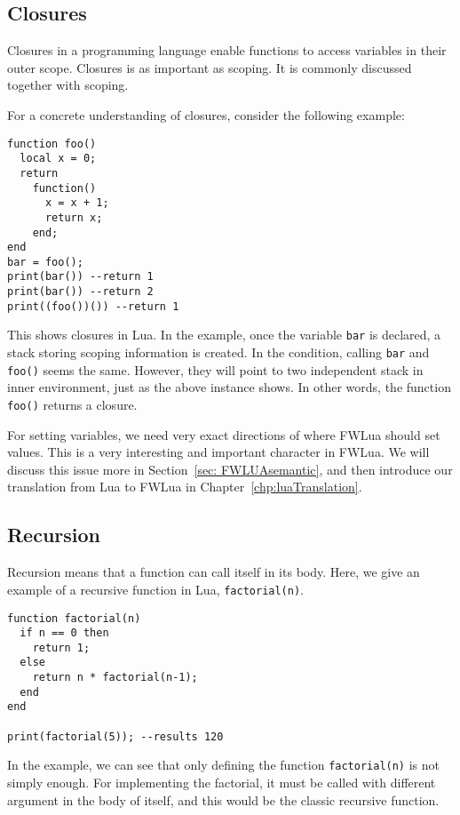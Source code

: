\subsection{Closures}
Closures in a programming language enable functions to access variables in their outer scope. Closures is as important as scoping. It is commonly discussed together with scoping.

For a concrete understanding of closures, consider the following example:
\begin{verbatim}
function foo()
  local x = 0;
  return 
    function() 
      x = x + 1;
      return x; 
    end;
end
bar = foo();
print(bar()) --return 1
print(bar()) --return 2
print((foo())()) --return 1
\end{verbatim}

This shows closures in Lua.
In the example, once the variable {\tt bar} is declared, a stack storing scoping information is created.
In the condition, calling {\tt bar} and {\tt foo()} seems the same. However, they will point to two independent stack in inner environment, just as the above instance shows. In other words, the function {\tt foo()} returns a closure.

For setting variables, we need very exact directions of where FWLua should set values. This is a very interesting and important character in FWLua. We will discuss this issue more in Section~\ref{sec: FWLUAsemantic}, and then introduce our translation from Lua to FWLua in Chapter~\ref{chp:luaTranslation}.

\subsection{Recursion}\label{sec:recursions}

Recursion means that a function can call itself in its body.
Here, we give an example of a recursive function in Lua, {\tt factorial(n)}.

\newpage

\begin{verbatim}
function factorial(n)
  if n == 0 then
    return 1;
  else
    return n * factorial(n-1);
  end
end

print(factorial(5)); --results 120
\end{verbatim}

In the example, we can see that only defining the function {\tt factorial(n)} is not simply enough. For implementing the factorial, it must be called with different argument in the body of itself, and this would be the classic recursive function.

